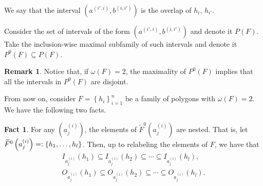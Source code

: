 \documentclass[12pt]{article}
\theoremstyle{definition}
\newtheorem{rmk}[thm]{Remark}
\newtheorem{fact}[thm]{Fact}
\newcommand{\eqdef}{=\vcentcolon}
\def\rxone{1.0/2}
\def\ryone{0.7/2}
\def\rxtwopoint{2.5/2}
\def\rytwopoint{1.5/2}
\def\rxfivepoint{5.5/2}
\def\ryfivepoint{3.0/2}
\begin{document}
\begin{figure}[ht]
\begin{center}
{
     }
     \end{center}
     \caption{}
     \label{figure:overlap}
     \end{figure} 

     We say that the interval
     $\left(a^{\left(i', i\right)},
     b^{\left(i, i'\right)}\right)$ 
     is the overlap of $h_{i}$, $h_{i'}$.

     Consider the set of intervals
     of the form $\left(a^{\left(i',i\right)},
     b^{\left(i,i'\right)}\right)$ 
     and denote it $P\left(F\right)$.
     Take the inclusion-wise maximal
     subfamily of such intervals
     and denote it $P^{0}\left(F\right)
     \subseteq P\left(F\right)$.
     
     \begin{rmk}
         Notice that, if 
         $\omega\left(F\right) = 2$,
         the maximality of
         $P^{0}\left(F\right)$ 
         implies that all the
         intervals in $P^{0}\left(F\right)$
         are disjoint.
     \end{rmk}

     From now on, consider
     $F = \left\{h_{i}\right\}_{i = 1}^{n}$ 
     be a family of polygons
     with $\omega\left(F\right)=2$.
     We have the following two facts.

     \begin{fact}
         For any $\left(a_{j}^{\left(i\right)}\right)$,
         the elements of
         $\widetilde{F}^{0}\left(a_{j}^{\left(i\right)}\right)$ 
         are nested. That is, let
             $\widetilde{F}^{0}\left(a_{j}^{\left(i\right)}\right) 
             \eqdef \left\{h_1, \ldots, h_{l}\right\}$.
         Then, up to relabeling
         the elements of $F$, we have that
         \begin{gather*}
             I_{a_{j}^{\left(i\right)}}\left(h_1\right)
             \subseteq I_{a_{j}^{\left(i\right)}}\left(h_2\right)
             \subseteq \cdots
             \subseteq I_{a_{j}^{\left(i\right)}}\left(h_{l}\right), \\
             O_{a_{j}^{\left(i\right)}}\left(h_1\right)
             \subseteq O_{a_{j}^{\left(i\right)}}\left(h_2\right)
             \subseteq \cdots
             \subseteq O_{a_{j}^{\left(i\right)}}\left(h_{l}\right).
         \end{gather*}
     \end{fact}
     
\end{document}

